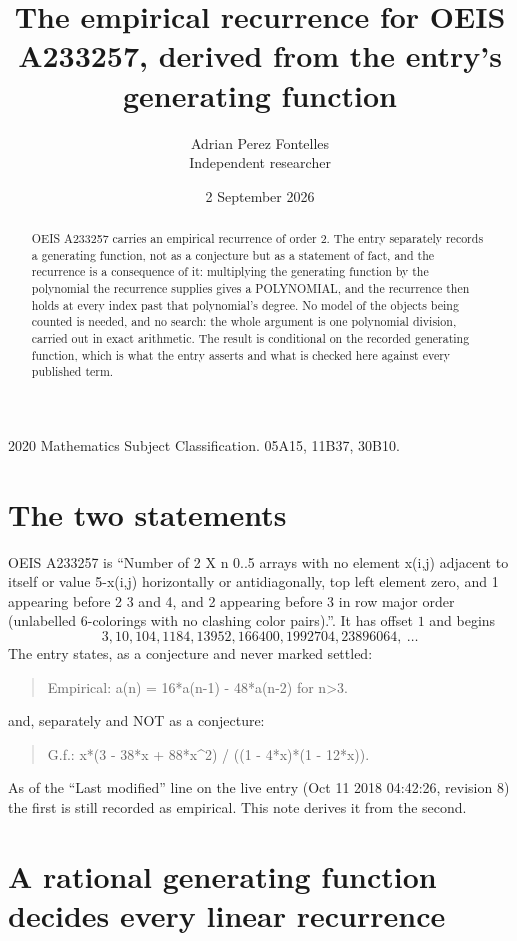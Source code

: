 \documentclass[11pt,a4paper]{article}
\title{The empirical recurrence for OEIS A233257, derived from the entry's generating function}
\author{Adrian Perez Fontelles\\ \small Independent researcher}
\date{2 September 2026}
\theoremstyle{plain}
\theoremstyle{definition}
\begin{document}
\maketitle

\begin{abstract}
OEIS A233257 carries an empirical recurrence of order $2$. The entry separately records a
generating function, not as a conjecture but as a statement of fact, and the recurrence is a
consequence of it: multiplying the generating function by the polynomial the recurrence
supplies gives a POLYNOMIAL, and the recurrence then holds at every index past that
polynomial's degree. No model of the objects being counted is needed, and no search: the
whole argument is one polynomial division, carried out in exact arithmetic. The result is
conditional on the recorded generating function, which is what the entry asserts and what is
checked here against every published term.
\end{abstract}

\noindent\small 2020 Mathematics Subject Classification. 05A15, 11B37, 30B10.\normalsize

\section{The two statements}

OEIS A233257 is ``Number of 2 X n 0..5 arrays with no element x(i,j) adjacent to itself or value 5-x(i,j) horizontally or antidiagonally, top left element zero, and 1 appearing before 2 3 and 4, and 2 appearing before 3 in row major order (unlabelled 6-colorings with no clashing color pairs).''. It has offset $1$ and begins
\[
3, 10, 104, 1184, 13952, 166400, 1992704, 23896064,\ \dots
\]
The entry states, as a conjecture and never marked settled:
\begin{quote}
Empirical: a(n) = 16*a(n-1) - 48*a(n-2) for n>3.
\end{quote}
and, separately and NOT as a conjecture:
\begin{quote}
G.f.: x*(3 - 38*x + 88*x\^{}2) / ((1 - 4*x)*(1 - 12*x)).
\end{quote}
As of the ``Last modified'' line on the live entry (Oct 11 2018 04:42:26, revision 8) the first is still
recorded as empirical. This note derives it from the second.

\section{A rational generating function decides every linear recurrence}
\end{document}
